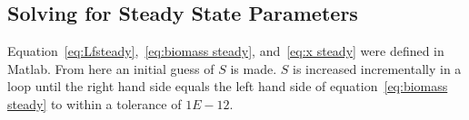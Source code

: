 \documentclass[letterpaper, twoside]{article}
\numberwithin{equation}{section}
\begin{document}
\subsection{Solving for Steady State Parameters}
Equation~\ref{eq:Lfsteady},~\ref{eq:biomass steady}, and~\ref{eq:x steady} were defined in Matlab. From here an initial guess of $S$ is made. $S$ is increased incrementally in a loop until the right hand side equals the left hand side of equation~\ref{eq:biomass steady} to within a tolerance of $1E-12$.
\end{document}
